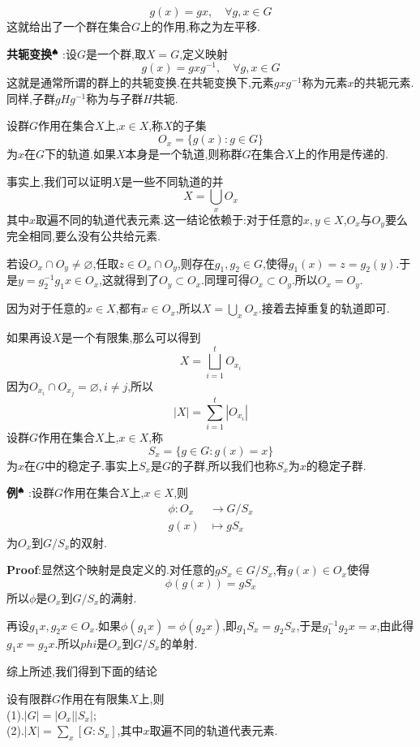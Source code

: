 $$
g(x)=gx,\quad \forall g,x\in G
$$
这就给出了一个群在集合$G$上的作用,称之为左平移.\par
\textbf{共轭变换}$^\spadesuit$ :设$G$是一个群,取$X=G$,定义映射
$$
g(x)=gxg^{-1},\quad \forall g,x\in G
$$
这就是通常所谓的群上的共轭变换.在共轭变换下,元素$gxg^{-1}$称为元素$x$的共轭元素.同样,子群$gHg^{-1}$称为与子群$H$共轭.\par
设群$G$作用在集合$X$上,$x\in X$,称$X$的子集
$$
O_x=\{g(x):g\in G\}
$$
为$x$在$G$下的轨道.如果$X$本身是一个轨道,则称群$G$在集合$X$上的作用是传递的.\par
事实上,我们可以证明$X$是一些不同轨道的并
$$
X=\bigcup_{x}O_x
$$
其中$x$取遍不同的轨道代表元素.这一结论依赖于:对于任意的$x,y\in X$,$O_x$与$O_y$要么完全相同,要么没有公共给元素.\par
若设$O_x\cap O_y\neq \varnothing$,任取$z\in O_x\cap O_y$,则存在$g_1,g_2\in G$,使得$g_1(x)=z=g_2(y)$.于是$y=g_2^{-1}g_1x\in O_x$,这就得到了$O_y\subset O_x$.同理可得$O_x\subset O_y$.所以$O_x=O_y$.\par
因为对于任意的$x\in X$,都有$x\in O_x$,所以$X=\bigcup_{x}O_x$.接着去掉重复的轨道即可.\par
如果再设$X$是一个有限集,那么可以得到
$$
X=\bigsqcup_{i=1}^t O_{x_i}
$$
因为$O_{x_{i}}\cap O_{x_j}=\varnothing,i\neq j$,所以
$$
|X|=\sum_{i=1}^t|O_{x_i}|
$$
\qquad 设群$G$作用在集合$X$上,$x\in X$,称
$$
S_x=\{g\in G:g(x)=x\}
$$
为$x$在$G$中的稳定子.事实上$S_x$是$G$的子群,所以我们也称$S_x$为$x$的稳定子群.\par
\textbf{例}$^\spadesuit$ :设群$G$作用在集合$X$上,$x\in X$,则
$$
\begin{aligned}
    \phi :O_x &\to G/S_x\\
          g(x) &\mapsto gS_x
\end{aligned}
$$
为$O_x$到$G/S_x$的双射.\par
\textbf{Proof}:显然这个映射是良定义的.对任意的$gS_x\in G/S_x$,有$g(x)\in O_x$使得
$$
\phi(g(x))=gS_x
$$
所以$\phi$是$O_x$到$G/S_x$的满射.\par
再设$g_1x,g_2x\in O_x$.如果$\phi(g_1x)=\phi(g_2x)$,即$g_1S_x=g_2S_x$,于是$g_1^{-1}g_2x=x$,由此得$g_1x=g_2x$.所以$phi$是$O_x$到$G/S_x$的单射.\par
综上所述,我们得到下面的结论
\begin{tcolorbox}[colback=KuangNei,colframe=BianKuang,title=\textbf{轨道公式},sharpish corners]
    设有限群$G$作用在有限集$X$上,则\\
    (1).$|G|=|O_x||S_x|$;\\
    (2).$|X|=\sum_{x}[G:S_{x}]$,其中$x$取遍不同的轨道代表元素.
\end{tcolorbox}

